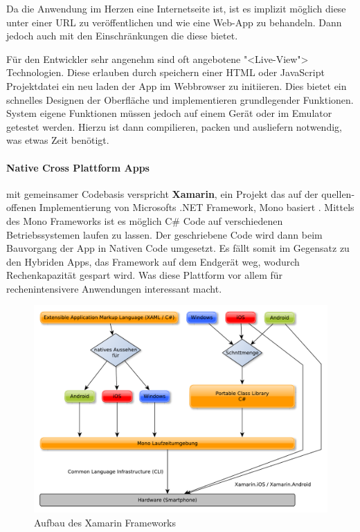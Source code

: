 Da die Anwendung im Herzen eine Internetseite ist, ist es implizit möglich diese unter einer URL zu veröffentlichen und wie eine Web-App zu behandeln. Dann jedoch auch mit den Einschränkungen die diese bietet.

Für den Entwickler sehr angenehm sind oft angebotene "<Live-View"> Technologien. Diese erlauben durch speichern einer HTML oder JavaScript Projektdatei ein neu laden der App im Webbrowser zu initiieren. Dies bietet ein schnelles Designen der Oberfläche und implementieren grundlegender Funktionen. System eigene Funktionen müssen jedoch auf einem Gerät oder im Emulator getestet werden. Hierzu ist dann compilieren, packen und ausliefern notwendig, was etwas Zeit benötigt.
\newpage
\paragraph{Native Cross Plattform Apps} mit gemeinsamer Codebasis verspricht \textbf{Xamarin}, ein Projekt das auf der quellen-offenen Implementierung von Microsofts .NET Framework, Mono basiert \cite{MONO16}. Mittels des Mono Frameworks ist es möglich C\# Code auf verschiedenen Betriebssystemen laufen zu lassen. Der geschriebene Code wird dann beim Bauvorgang der App in Nativen Code umgesetzt. Es fällt somit im Gegensatz zu den Hybriden Apps, das Framework auf dem Endgerät weg, wodurch Rechenkapazität gespart wird. Was diese Plattform vor allem für rechenintensivere Anwendungen interessant macht.

\begin{figure}[H]
	\centering
	\includegraphics[scale=0.58]{images/Xamarin}
	\caption[Aufbau des Xamarin Frameworks]{Aufbau des Xamarin Frameworks}
	\label{XamarinBild}
\end{figure}

